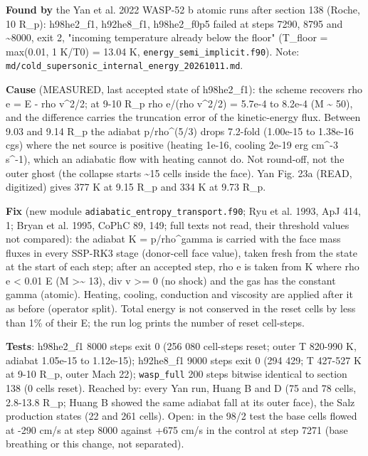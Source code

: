 \documentclass[english,a4paper]{my_memo}
\begin{document}
\textbf{Found by} the Yan et al. 2022 WASP-52 b atomic runs after section 138 (Roche, 10 R\_p): h98he2\_f1, h92he8\_f1, h98he2\_f0p5 failed at steps 7290, 8795 and \textasciitilde8000, exit 2, "incoming temperature already below the floor" (T\_floor = max(0.01, 1 K/T0) = 13.04 K, \texttt{energy\_semi\_implicit.f90}). Note: \texttt{md/cold\_supersonic\_internal\_energy\_20261011.md}.

\textbf{Cause} (MEASURED, last accepted state of h98he2\_f1): the scheme recovers rho e = E - rho v\^{}2/2; at 9-10 R\_p rho e/(rho v\^{}2/2) = 5.7e-4 to 8.2e-4 (M \textasciitilde{} 50), and the difference carries the truncation error of the kinetic-energy flux. Between 9.03 and 9.14 R\_p the adiabat p/rho\^{}(5/3) drops 7.2-fold (1.00e-15 to 1.38e-16 cgs) where the net source is positive (heating 1e-16, cooling 2e-19 erg cm\^{}-3 s\^{}-1), which an adiabatic flow with heating cannot do. Not round-off, not the outer ghost (the collapse starts \textasciitilde15 cells inside the face). Yan Fig. 23a (READ, digitized) gives 377 K at 9.15 R\_p and 334 K at 9.73 R\_p.

\textbf{Fix} (new module \texttt{adiabatic\_entropy\_transport.f90}; Ryu et al. 1993, ApJ 414, 1; Bryan et al. 1995, CoPhC 89, 149; full texts not read, their threshold values not compared): the adiabat K = p/rho\^{}gamma is carried with the face mass fluxes in every SSP-RK3 stage (donor-cell face value), taken fresh from the state at the start of each step; after an accepted step, rho e is taken from K where rho e \textless{} 0.01 E (M \textgreater\textasciitilde{} 13), div v \textgreater= 0 (no shock) and the gas has the constant gamma (atomic). Heating, cooling, conduction and viscosity are applied after it as before (operator split). Total energy is not conserved in the reset cells by less than 1\% of their E; the run log prints the number of reset cell-steps.

\textbf{Tests}: h98he2\_f1 8000 steps exit 0 (256 080 cell-steps reset; outer T 820-990 K, adiabat 1.05e-15 to 1.12e-15); h92he8\_f1 9000 steps exit 0 (294 429; T 427-527 K at 9-10 R\_p, outer Mach 22); \texttt{wasp\_full} 200 steps bitwise identical to section 138 (0 cells reset). Reached by: every Yan run, Huang B and D (75 and 78 cells, 2.8-13.8 R\_p; Huang B showed the same adiabat fall at its outer face), the Salz production states (22 and 261 cells). Open: in the 98/2 test the base cells flowed at -290 cm/s at step 8000 against +675 cm/s in the control at step 7271 (base breathing or this change, not separated).
\end{document}
